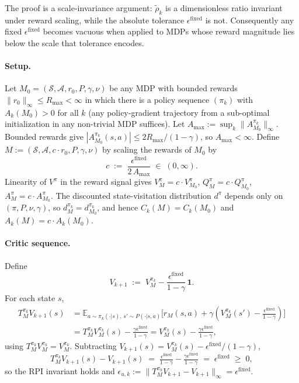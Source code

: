 \documentclass{article}
\begin{document}
The proof is a scale-invariance argument: $\tilde\rho_k$ is a dimensionless ratio invariant under reward scaling, while the absolute tolerance $\epsilon^{\text{fixed}}$ is not. Consequently any fixed $\epsilon^{\text{fixed}}$ becomes vacuous when applied to MDPs whose reward magnitude lies below the scale that tolerance encodes.

\paragraph{Setup.} Let $M_0 = (\mathcal{S}, \mathcal{A}, r_0, P, \gamma, \nu)$ be any MDP with bounded rewards $\|r_0\|_\infty \le R_{\max} < \infty$ in which there is a policy sequence $(\pi_k)$ with $A_k(M_0) > 0$ for all $k$ (any policy-gradient trajectory from a sub-optimal initialization in any non-trivial MDP suffices). Let $A_{\max} := \sup_k \|A^{\pi_k}_{M_0}\|_\infty$. Bounded rewards give $|A^{\pi_k}_{M_0}(s,a)| \le 2 R_{\max}/(1-\gamma)$, so $A_{\max} < \infty$. Define $M := (\mathcal{S}, \mathcal{A}, c \cdot r_0, P, \gamma, \nu)$ by scaling the rewards of $M_0$ by
\begin{equation*}
c \;:=\; \frac{\epsilon^{\text{fixed}}}{2 \, A_{\max}} \;\in\; (0, \infty).
\end{equation*}
Linearity of $V^\pi$ in the reward signal gives $V^\pi_M = c \cdot V^\pi_{M_0}$, $Q^\pi_M = c \cdot Q^\pi_{M_0}$, $A^\pi_M = c \cdot A^\pi_{M_0}$. The discounted state-visitation distribution $d^\pi$ depends only on $(\pi, P, \nu, \gamma)$, so $d^{\pi_k}_M = d^{\pi_k}_{M_0}$, and hence $C_k(M) = C_k(M_0)$ and $A_k(M) = c \cdot A_k(M_0)$.

\paragraph{Critic sequence.} Define
\begin{equation*}
V_{k+1} \;:=\; V^{\pi_k}_M - \frac{\epsilon^{\text{fixed}}}{1-\gamma} \, \mathbf{1}.
\end{equation*}
For each state $s$,
\begin{align*}
T^{\pi_k}_M V_{k+1}(s)
&= \mathbb{E}_{a \sim \pi_k(\cdot|s),\,s' \sim P(\cdot|s,a)}\!\Big[r_M(s,a) + \gamma\!\left(V^{\pi_k}_M(s') - \tfrac{\epsilon^{\text{fixed}}}{1-\gamma}\right)\!\Big]\\
&= T^{\pi_k}_M V^{\pi_k}_M(s) - \tfrac{\gamma \epsilon^{\text{fixed}}}{1-\gamma} = V^{\pi_k}_M(s) - \tfrac{\gamma \epsilon^{\text{fixed}}}{1-\gamma},
\end{align*}
using $T^{\pi_k}_M V^{\pi_k}_M = V^{\pi_k}_M$. Subtracting $V_{k+1}(s) = V^{\pi_k}_M(s) - \epsilon^{\text{fixed}}/(1-\gamma)$,
\begin{equation*}
T^{\pi_k}_M V_{k+1}(s) - V_{k+1}(s) \;=\; \tfrac{\epsilon^{\text{fixed}}}{1-\gamma} - \tfrac{\gamma \epsilon^{\text{fixed}}}{1-\gamma} \;=\; \epsilon^{\text{fixed}} \;\geq\; 0,
\end{equation*}
so the RPI invariant holds and $\epsilon_{u,k} := \|T^{\pi_k}_M V_{k+1} - V_{k+1}\|_\infty = \epsilon^{\text{fixed}}$.
\end{document}
